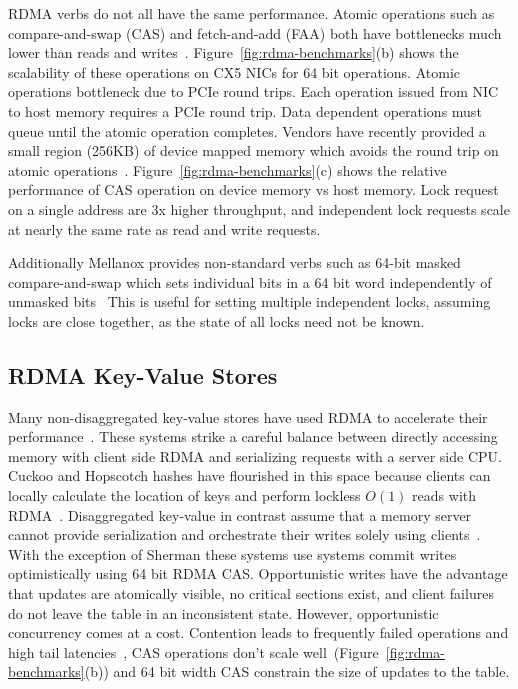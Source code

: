 RDMA verbs do not all have the same performance. Atomic
operations such as compare-and-swap (CAS) and fetch-and-add
(FAA) both have bottlenecks much lower than reads and
writes~\cite{design-guidelines,sherman}.
Figure~\ref{fig:rdma-benchmarks}(b) shows the scalability of
these operations on CX5 NICs for 64 bit operations.
Atomic operations bottleneck due to PCIe round trips. 
Each operation issued from NIC to host memory requires a
PCIe round trip. Data dependent operations must queue until
the atomic operation completes.
Vendors have recently provided a small region (256KB)
of device mapped memory which avoids the round trip on
atomic operations~\cite{device-memory}.
Figure~\ref{fig:rdma-benchmarks}(c) shows the relative
performance of CAS operation on device memory vs host
memory. Lock request on a single address are 3x higher
throughput, and independent lock requests scale at nearly
the same rate as read and write requests.

Additionally Mellanox provides non-standard verbs such as
64-bit masked compare-and-swap which sets individual bits in
a 64 bit word independently of unmasked
bits~\cite{rdma-masked-cas} This is useful for setting
multiple independent locks, assuming locks are close
together, as the state of all locks need not be known.


\subsection{RDMA Key-Value Stores}

Many non-disaggregated key-value stores have used RDMA to
accelerate their
performance~\cite{farm,memc3,erpc,herd,faast,mica,pilaf,cell,storm}.
These systems strike a careful balance between directly
accessing memory with client side RDMA and serializing
requests with a server side CPU.
Cuckoo and Hopscotch hashes have flourished in this space
because clients can locally calculate the location of keys
and perform lockless $O(1)$ reads with
RDMA~\cite{hopscotch,farm,pilaf,cuckoo}.
Disaggregated key-value in contrast assume that a memory
server cannot provide serialization and orchestrate their
writes solely using
clients~\cite{rolex,fusee,clover,sherman,ford,race}. With
the exception of Sherman these systems use systems commit
writes optimistically using 64 bit RDMA CAS. 
Opportunistic writes have the advantage that updates are
atomically visible, no critical sections exist, and client
failures do not leave the table in an inconsistent state.
However, opportunistic concurrency comes at a cost.
Contention leads to frequently failed operations and high
tail latencies~\cite{clover}, CAS operations don't scale
well~\cite{design-guidelines}(Figure~\ref{fig:rdma-benchmarks}(b))
and 64 bit width CAS constrain the size of updates to the
table.

